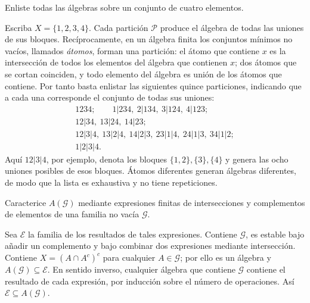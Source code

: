 \begin{ejercicio}\label{ej:v2-l01-4}
Enliste todas las álgebras sobre un conjunto de cuatro elementos.
\end{ejercicio}
\begin{solucion}
Escriba $X=\{1,2,3,4\}$. Cada partición $\mathcal P$ produce el álgebra de todas las uniones de sus bloques. Recíprocamente, en un álgebra finita los conjuntos mínimos no vacíos, llamados \emph{átomos}, forman una partición: el átomo que contiene $x$ es la intersección de todos los elementos del álgebra que contienen $x$; dos átomos que se cortan coinciden, y todo elemento del álgebra es unión de los átomos que contiene. Por tanto basta enlistar las siguientes quince particiones, indicando que a cada una corresponde el conjunto de todas sus uniones:
\[
\begin{gathered}
1234;\qquad 1|234,\ 2|134,\ 3|124,\ 4|123;\\
12|34,\ 13|24,\ 14|23;\\
12|3|4,\ 13|2|4,\ 14|2|3,\ 23|1|4,\ 24|1|3,\ 34|1|2;\\
1|2|3|4.
\end{gathered}
\]
Aquí $12|3|4$, por ejemplo, denota los bloques $\{1,2\},\{3\},\{4\}$ y genera las ocho uniones posibles de esos bloques. Átomos diferentes generan álgebras diferentes, de modo que la lista es exhaustiva y no tiene repeticiones.
\end{solucion}

\begin{ejercicio}\label{ej:v2-l01-5}
Caracterice $A(\mathcal G)$ mediante expresiones finitas de intersecciones y complementos de elementos de una familia no vacía $\mathcal G$.
\end{ejercicio}
\begin{solucion}
Sea $\mathcal E$ la familia de los resultados de tales expresiones. Contiene $\mathcal G$, es estable bajo añadir un complemento y bajo combinar dos expresiones mediante intersección. Contiene $X=(A\cap A^c)^c$ para cualquier $A\in\mathcal G$; por ello es un álgebra y $A(\mathcal G)\subseteq\mathcal E$. En sentido inverso, cualquier álgebra que contiene $\mathcal G$ contiene el resultado de cada expresión, por inducción sobre el número de operaciones. Así $\mathcal E\subseteq A(\mathcal G)$.
\end{solucion}

